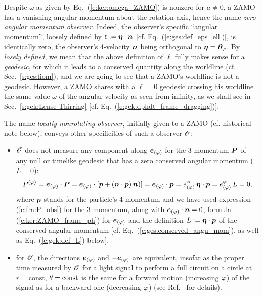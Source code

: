 Despite $\omega$ as given by Eq.~(\ref{e:ker:omega_ZAMO}) is nonzero for $a\neq 0$, a ZAMO has a vanishing angular momentum about the rotation axis,
hence the name \emph{zero-angular momentum observer}. Indeed, the observer's specific ``angular momentum'', loosely defined by $\ell := \bm{\eta}\cdot\bm{n}$ [cf. Eq.~(\ref{e:ges:def_eps_ell})], is identically
zero, the observer's 4-velocity $\bm{n}$ being orthogonal to $\bm{\eta} = \bm{\partial}_\varphi$. By \emph{losely
defined}, we mean that the above definition of $\ell$  fully makes sense for a \emph{geodesic},
for which it leads to
a conserved quantity along the worldline (cf. Sec.~\ref{s:ges:fiom}), and we are going to see
that a ZAMO's worldline is not a geodesic. However, a ZAMO shares with a $\ell=0$ geodesic
crossing his worldline the same value $\omega$ of the angular velocity as seen from infinity,
as we shall see in Sec.~\ref{s:gek:Lense-Thirring} [cf. Eq.~(\ref{e:gek:dphdt_frame_dragging})].


The name \emph{locally nonrotating observer}, initially given to a ZAMO (cf. historical note below),
conveys other specificities of such a observer $\mathscr{O}$:
\begin{itemize}
\item
$\mathscr{O}$ does not measure any component
along $\bm{e}_{(\varphi)}$ for the 3-momentum $\bm{P}$ of any null or timelike geodesic
that has a zero conserved angular momentum ($L=0$):
\[
    P^{(\varphi)} = \bm{e}_{(\varphi)}\cdot\bm{P} = \bm{e}_{(\varphi)}\cdot[\bm{p} + (\bm{n}\cdot\bm{p})\, \bm{n})] =
     \bm{e}_{(\varphi)}\cdot\bm{p} = e_{(\varphi)}^\varphi \, \bm{\eta}\cdot\bm{p} =  e_{(\varphi)}^\varphi \, L = 0 ,
\]
where $\bm{p}$ stands for the particle's 4-momentum and we have used expression
(\ref{e:fra:P_obs}) for the 3-momentum, along with $\bm{e}_{(\varphi)}\cdot\bm{n} = 0$,
formula (\ref{e:ker:ZAMO_frame_ph}) for $\bm{e}_{(\varphi)}$ and the
definition $L := \bm{\eta}\cdot\bm{p}$ of the conserved angular momentum
[cf. Eq.~(\ref{e:ges:conserved_angu_mom}), as well as Eq.~(\ref{e:gek:def_L}) below].
\item for $\mathscr{O}$, the directions $\bm{e}_{(\varphi)}$ and $-\bm{e}_{(\varphi)}$ are equivalent,
insofar as the proper time measured by $\mathscr{O}$ for a light signal to perform a full circuit on a circle
at $r=\mathrm{const}$, $\theta=\mathrm{const}$ is the same for a forward motion (increasing $\varphi$)
of the signal as for a backward one (decreasing $\varphi$)  (see Ref.~\cite{Barde70b} for details).
\end{itemize}

